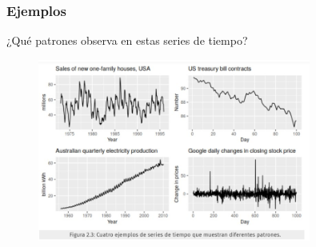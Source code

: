 \documentclass[10pt]{beamer}
\begin{document}



\begin{frame}[fragile]
\frametitle{Ejemplos}

¿Qué patrones observa en estas series de tiempo?

\begin{figure}
\begin{center}
    \includegraphics[width=0.8\textwidth]{Imagen19.JPG}
\end{center}
\end{figure}

\end{frame}


\end{document}
